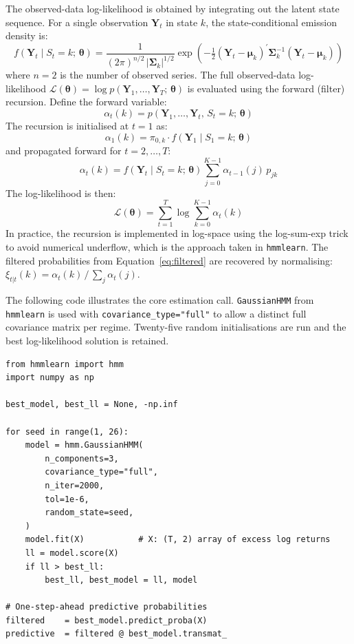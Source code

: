 \documentclass[12pt, a4paper]{article}
\begin{document}
The observed-data log-likelihood is obtained by integrating out the latent state sequence.
For a single observation $\mathbf{Y}_t$ in state $k$, the state-conditional emission density is:
\begin{equation}
  f(\mathbf{Y}_t \mid S_t = k;\,\boldsymbol{\theta})
  = \frac{1}{(2\pi)^{n/2}\,|\boldsymbol{\Sigma}_k|^{1/2}}
    \exp\!\left(-\tfrac{1}{2}
    (\mathbf{Y}_t - \boldsymbol{\mu}_k)^\prime
    \boldsymbol{\Sigma}_k^{-1}
    (\mathbf{Y}_t - \boldsymbol{\mu}_k)
    \right)
  \label{eq:emission_density}
\end{equation}
where $n = 2$ is the number of observed series. The full observed-data log-likelihood
$\mathcal{L}(\boldsymbol{\theta}) = \log p(\mathbf{Y}_1,\ldots,\mathbf{Y}_T;\,\boldsymbol{\theta})$
is evaluated using the forward (filter) recursion. Define the forward variable:
\begin{equation}
  \alpha_t(k) = p(\mathbf{Y}_1,\ldots,\mathbf{Y}_t,\, S_t = k;\,\boldsymbol{\theta})
  \label{eq:forward_var}
\end{equation}
The recursion is initialised at $t = 1$ as:
\begin{equation}
  \alpha_1(k) = \pi_{0,k} \cdot f(\mathbf{Y}_1 \mid S_1 = k;\,\boldsymbol{\theta})
\end{equation}
and propagated forward for $t = 2,\ldots,T$:
\begin{equation}
  \alpha_t(k) = f(\mathbf{Y}_t \mid S_t = k;\,\boldsymbol{\theta})
                \sum_{j=0}^{K-1} \alpha_{t-1}(j)\, p_{jk}
  \label{eq:forward_recursion}
\end{equation}
The log-likelihood is then:
\begin{equation}
  \mathcal{L}(\boldsymbol{\theta})
  = \sum_{t=1}^{T} \log \sum_{k=0}^{K-1} \alpha_t(k)
  \label{eq:loglik}
\end{equation}
In practice, the recursion is implemented in log-space using the log-sum-exp trick to avoid
numerical underflow, which is the approach taken in \texttt{hmmlearn}. The filtered
probabilities from Equation~\eqref{eq:filtered} are recovered by normalising:
$\xi_{t|t}(k) = \alpha_t(k) \,/\, \sum_j \alpha_t(j)$.

The following code illustrates the core estimation call. \texttt{GaussianHMM} from \texttt{hmmlearn} is used with \texttt{covariance\_type="full"} to allow a distinct full covariance matrix per regime. Twenty-five random initialisations are run and the best log-likelihood solution is retained.

\begin{verbatim}
from hmmlearn import hmm
import numpy as np

best_model, best_ll = None, -np.inf

for seed in range(1, 26):
    model = hmm.GaussianHMM(
        n_components=3,
        covariance_type="full",
        n_iter=2000,
        tol=1e-6,
        random_state=seed,
    )
    model.fit(X)           # X: (T, 2) array of excess log returns
    ll = model.score(X)
    if ll > best_ll:
        best_ll, best_model = ll, model

# One-step-ahead predictive probabilities
filtered    = best_model.predict_proba(X)
predictive  = filtered @ best_model.transmat_
\end{verbatim}
\end{document}
